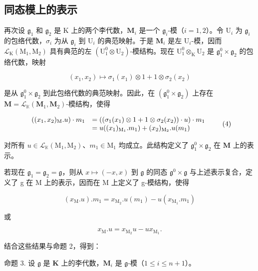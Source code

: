 \subsection{同态模上的表示}

再次设 \(\mathfrak{g}_1\) 和 \(\mathfrak{g}_2\) 是 K 上的两个李代数，\(\mathbf{M}_i\) 是一个 \(\mathfrak{g}_i\)-模（\(i = 1, 2\)）。令 \(\mathrm{U}_i\) 为 \(\mathfrak{g}_i\) 的包络代数，\(\sigma_i\) 为从 \(\mathfrak{g}_i\) 到 \(\mathrm{U}_i\) 的典范映射。于是 \(\mathbf{M}_i\) 是左 \(\mathrm{U}_i\)-模，因而 \(\mathcal{L}_{\mathrm{K}}(\mathrm{M}_1, \mathrm{M}_2)\) 具有典范的左 \((\mathrm{U}_1^0 \otimes \mathrm{U}_2)\)-模结构。现在 \(\mathrm{U}_1^0 \otimes_{\mathrm{K}} \mathrm{U}_2\) 是 \(\mathfrak{g}_1^0 \times \mathfrak{g}_2\) 的包络代数，映射

\[
(x _ {1}, x _ {2}) \mapsto \sigma_ {1} (x _ {1}) \otimes 1 + 1 \otimes \sigma_ {2} (x _ {2})
\]

是从 \(\mathfrak{g}_1^0\times \mathfrak{g}_2\) 到此包络代数的典范映射。因此，在 \((\mathfrak{g}_1^0\times \mathfrak{g}_2)\) 上存在 \(\mathbf{M} = \mathcal{L}_{\mathbb{K}}(\mathbf{M}_1,\mathbf{M}_2)\)-模结构，使得

\[
\begin{array}{r l} ((x _ {1}, x _ {2}) _ {\mathrm{M}}. u) \cdot m _ {1} & = ((\sigma_ {1} (x _ {1}) \otimes 1 + 1 \otimes \sigma_ {2} (x _ {2})) \cdot u) \cdot m _ {1} \\ & = u ((x _ {1}) _ {\mathrm{M} _ {1}}. m _ {1}) + (x _ {2}) _ {\mathrm{M} _ {2}}. u (m _ {1}) \end{array}\tag{4}
\]

对所有 \(u \in \mathcal{L}_{\mathbb{K}}(\mathrm{M}_1, \mathrm{M}_2)\)、\(m_1 \in \mathrm{M}_1\) 均成立。此结构定义了 \(\mathfrak{g}_1^0 \times \mathfrak{g}_2\) 在 \(\mathbf{M}\) 上的表示。

若现在 \(\mathfrak{g}_1 = \mathfrak{g}_2 = \mathfrak{g}\)，则从 \(x \mapsto (-x, x)\) 到 \(\mathfrak{g}\) 的同态 \(\mathfrak{g}^0 \times \mathfrak{g}\) 与上述表示复合，定义了 g 在 M 上的表示，因而在 M 上定义了 g-模结构，使得

\[
(x _ {\mathrm{M}}. u). m _ {1} = x _ {\mathrm{M} _ {2}}. u (m _ {1}) - u (x _ {\mathrm{M} _ {1}}. m _ {1})\tag{5}
\]

或

\[
x _ {\mathrm{M}}. u = x _ {\mathrm{M} _ {2}} u - u x _ {\mathrm{M} _ {1}}.\tag{6}
\]

结合这些结果与命题 2，得到：

命题 3. 设 \(\mathfrak{g}\) 是 \(\mathbf{K}\) 上的李代数，\(\mathbf{M}_i\) 是 \(\mathfrak{g}\)-模（\(1 \leqslant i \leqslant n + 1\)）。

